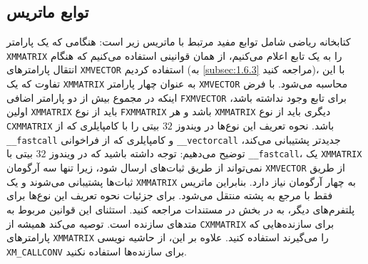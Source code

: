 \textbf{\vspace{-60pt}}
\subsection{\textbf{توابع ماتریس}}
\label{subsec:2.8.2}
{
    \Large
    \begin{spacing}{1.5}
        کتابخانه ریاضی  شامل توابع مفید مرتبط با ماتریس زیر است:
        \textbf{\vspace{6pt}}
        \lr{}
        \textbf{\vspace{6pt}}
        هنگامی که یک پارامتر \texttt{XMMATRIX} را به یک تابع اعلام می‌کنیم، از همان قوانینی استفاده می‌کنیم که هنگام انتقال پارامترهای \texttt{XMVECTOR} استفاده کردیم
        (به \ref{subsec:1.6.3} مراجعه کنید)،
        با این تفاوت که یک \texttt{XMMATRIX} به عنوان چهار پارامتر \texttt{XMVECTOR} محاسبه می‌شود.
        با فرض اینکه در مجموع بیش از دو پارامتر اضافی \texttt{FXMVECTOR} برای تابع وجود نداشته باشد،
        اولین \texttt{XMMATRIX} باید از نوع \texttt{FXMMATRIX} باشد و هر \texttt{XMMATRIX} دیگری باید از نوع \texttt{CXMMATRIX} باشد.
        نحوه تعریف این نوع‌ها در ویندوز $32$ بیتی را با کامپایلری که از \texttt{\_\_fastcall}
        و کامپایلری که از فراخوانی \texttt{\_\_vectorcall} جدیدتر پشتیبانی می‌کند، توضیح می‌دهیم:
        \textbf{\vspace{3pt}}
        \lr{}
        \textbf{\vspace{6pt}}
        توجه داشته باشید که در ویندوز $32$ بیتی با \texttt{\_\_fastcall}، یک \texttt{XMMATRIX} نمی‌تواند از طریق ثبات‌های  ارسال شود،
        زیرا تنها سه آرگومان \texttt{XMVECTOR} از طریق ثبات‌ها پشتیبانی می‌شوند و یک \texttt{XMMATRIX} به چهار آرگومان نیاز دارد.
        بنابراین ماتریس فقط با مرجع به پشته منتقل می‌شود.
        برای جزئیات نحوه تعریف این نوع‌ها برای پلتفرم‌های دیگر، به  در بخش  در مستندات  مراجعه کنید.
        استثنای این قوانین مربوط به متدهای سازنده است.
         توصیه می‌کند همیشه از \texttt{CXMMATRIX} برای سازنده‌هایی که پارامترهای \texttt{XMMATRIX} را می‌گیرند استفاده کنید.
        علاوه بر این، از حاشیه نویسی \texttt{XM\_CALLCONV} برای سازنده‌ها استفاده نکنید.
    \end{spacing}
}

